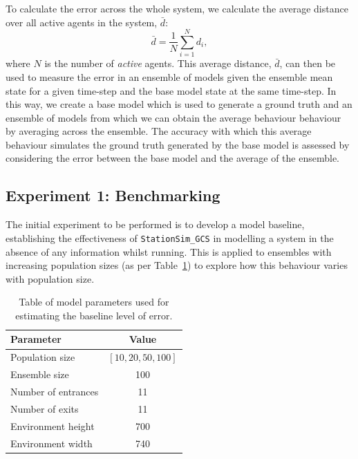 \documentclass{article}
\begin{document}
To calculate the error across the whole system, we calculate the average distance over all active agents in the system, $\bar{d}$:
\begin{equation}
    \bar{d} = \frac{1}{N} \sum_{i=1}^{N} d_i,
    \label{eq:model_level_error1}
\end{equation}
where $N$ is the number of \emph{active} agents. This average distance, $\bar{d}$, can then be used to measure the error in an ensemble of models given the ensemble mean state for a given time-step and the base model state at the same time-step. 
In this way, we create a base model which is used to generate a ground truth and an ensemble of models from which we can obtain the average behaviour behaviour by averaging across the ensemble. 
The accuracy with which this average behaviour simulates the ground truth generated by the base model is assessed by considering the error between the base model and the average of the ensemble.



\subsection{Experiment 1: Benchmarking}\label{sub:exp:bench}

The initial experiment to be performed is to develop a model baseline, establishing the effectiveness of \texttt{StationSim\_GCS} in modelling a system in the absence of any information whilst running. This is applied to ensembles with increasing population sizes (as per Table~\ref{tab:gcs_baseline_params}) to explore how this behaviour varies with population size.

\begin{table}[ht]
    \centering
    \begin{tabular}{@{}lc@{}}
        \toprule
        Parameter           & Value \\ \midrule
        Population size     & $[10, 20, 50, 100 ]$   \\
        Ensemble size       & 100   \\
        Number of entrances & 11    \\
        Number of exits     & 11    \\
        Environment height  & 700   \\
        Environment width   & 740   \\ \bottomrule
    \end{tabular}\caption{Table of model parameters used for estimating the
    baseline level of error.}\label{tab:gcs_baseline_params}
\end{table}
\end{document}
